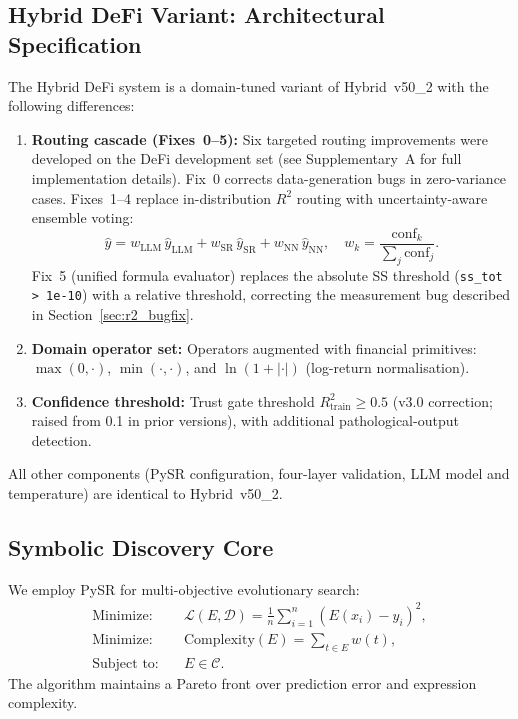 \documentclass[twoside,11pt]{article}
\begin{document}
\subsection{Hybrid DeFi Variant: Architectural Specification}\label{subsec:hybrid-defi-variant-architectural-specif}
\label{sec:hybrid_defi_spec}

The Hybrid DeFi system is a domain-tuned variant of Hybrid~v50\_2 with the
following differences:

\begin{enumerate}
\item \textbf{Routing cascade (Fixes~0--5):} Six targeted routing improvements
  were developed on the DeFi development set (see Supplementary~A for full
  implementation details).  Fix~0 corrects data-generation bugs in zero-variance
  cases.  Fixes~1--4 replace in-distribution $R^2$ routing with uncertainty-aware
  ensemble voting:
  \[
    \hat{y} = w_\mathrm{LLM}\,\hat{y}_\mathrm{LLM}
             + w_\mathrm{SR}\,\hat{y}_\mathrm{SR}
             + w_\mathrm{NN}\,\hat{y}_\mathrm{NN},
    \quad w_k = \frac{\mathrm{conf}_k}{\sum_j \mathrm{conf}_j}.
  \]
  Fix~5 (unified formula evaluator) replaces the absolute SS threshold
  (\texttt{ss\_tot > 1e-10}) with a relative threshold, correcting the
  measurement bug described in Section~\ref{sec:r2_bugfix}.
\item \textbf{Domain operator set:} Operators augmented with financial
  primitives: $\max(0,\cdot)$, $\min(\cdot,\cdot)$, and
  $\ln(1+|\cdot|)$ (log-return normalisation).
\item \textbf{Confidence threshold:} Trust gate threshold $R^2_{\mathrm{train}} \geq 0.5$
  (v3.0 correction; raised from 0.1 in prior versions), with additional
  pathological-output detection.
\end{enumerate}

All other components (PySR configuration, four-layer validation, LLM model and
temperature) are identical to Hybrid~v50\_2.

\subsection{Symbolic Discovery Core}\label{subsec:symbolic-discovery-core}
\label{sec:arch_discovery}

We employ PySR \citep{cranmer2023pysr} for multi-objective evolutionary search:
\begin{align}
\text{Minimize:} \quad
& \mathcal{L}(E,\mathcal{D})
  = \frac{1}{n}\sum_{i=1}^n (E(x_i) - y_i)^2, \label{eq:loss}\\
\text{Minimize:} \quad
& \mathrm{Complexity}(E) = \sum_{t \in E} w(t), \label{eq:complexity}\\
\text{Subject to:} \quad
& E \in \mathcal{C}. \label{eq:constraints}
\end{align}
The algorithm maintains a Pareto front over prediction error and expression
complexity.
\end{document}
